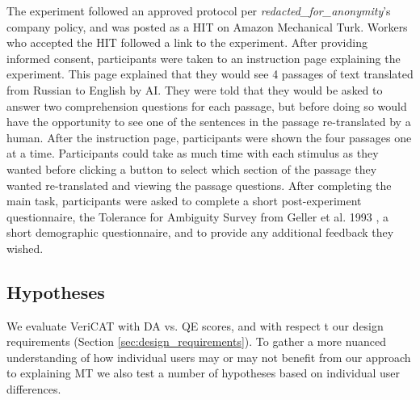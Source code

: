 The experiment followed an approved protocol per \textit{redacted\_for\_anonymity}’s company policy, and was posted as a HIT on Amazon Mechanical Turk. Workers who accepted the HIT followed a link to the experiment. After providing informed consent, participants were taken to an instruction page explaining the experiment. This page explained that they would see 4 passages of text translated from Russian to English by AI. They were told that they would be asked to answer two comprehension questions for each passage, but before doing so would have the opportunity to see one of the sentences in the passage re-translated by a human. After the instruction page, participants were shown the four passages one at a time. Participants could take as much time with each stimulus as they wanted before clicking a button to select which section of the passage they wanted re-translated and viewing the passage questions. After completing the main task, participants were asked to complete a short post-experiment questionnaire, the Tolerance for Ambiguity Survey from Geller et al. 1993 \cite{gellerTolerance1993}, a short demographic questionnaire, and to provide any additional feedback they wished.

\subsection{Hypotheses}


We evaluate VeriCAT with DA vs. QE scores, and with respect t our design requirements (Section \ref{sec:design_requirements}). To gather a more nuanced understanding of how individual users may or may not benefit from our approach to explaining MT we also test a number of hypotheses based on individual user differences. 


